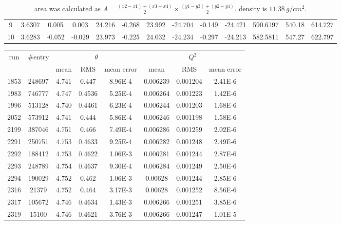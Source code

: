 \begin{landscape}
\begin{table}
\begin{tabular}{c | c | c c c c c c c c | c c c}
	9   & 3.6307	& 0.005	    & 0.003	& 24.216    & -0.268    & 23.992    & -24.704	& -0.149    & -24.421	& 590.6197  & 540.18	& 614.727	\\
	10  & 3.6283	& -0.052    & -0.029	& 23.973    & -0.225	& 24.032    & -24.234	& -0.297    & -24.213	& 582.5811  & 547.27	& 622.797	\\
	\hline
    \end{tabular}
    \caption{area was calculated as $A = \frac{(x2 - x1) + (x3 - x4)}{2} \times \frac{(y1 - y3) + (y2 - y4)}{2}$. 
    \Pb density is $11.38\ g/cm^2$.}
\end{table}
\end{landscape}

\begin{table}
    \centering
    \begin{tabular}{c c | c c c | c c c}
	\hline
	\multirow{2}{*}{run} & \multirow{2}{*}{\#entry}	& \multicolumn{3}{c|}{$\theta$}	& \multicolumn{3}{c}{$Q^2$} \\
	\cline{3-8}
	    &	& mean & RMS	& mean error	& mean	& RMS	& mean error	\\
	\hline
	1853	& 248697    & 4.741 & 0.447	& 8.96E-4    & 0.006239    & 0.001204    & 2.41E-6    \\
	1983	& 746777    & 4.747 & 0.4536	& 5.25E-4    & 0.006264    & 0.001223    & 1.42E-6    \\
	1996	& 513128    & 4.740 & 0.4461	& 6.23E-4    & 0.006244    & 0.001203    & 1.68E-6    \\
	2052	& 573912    & 4.741 & 0.444	& 5.86E-4    & 0.006246    & 0.001198    & 1.58E-6    \\
	2199	& 387046    & 4.751 & 0.466	& 7.49E-4    & 0.006286    & 0.001259    & 2.02E-6    \\
	2291	& 250751    & 4.753 & 0.4633	& 9.25E-4    & 0.006282    & 0.001248    & 2.49E-6    \\
	2292	& 188412    & 4.753 & 0.4622	& 1.06E-3    & 0.006281    & 0.001244    & 2.87E-6    \\
	2293	& 248789    & 4.754 & 0.4637	& 9.30E-4    & 0.006284    & 0.001249    & 2.50E-6    \\
	2294	& 190029    & 4.752 & 0.462	& 1.06E-3    & 0.00628	   & 0.001244    & 2.85E-6    \\
	2316	& 21379	    & 4.752 & 0.464	& 3.17E-3    & 0.00628	   & 0.001252    & 8.56E-6    \\
	2317	& 105672    & 4.746 & 0.4634	& 1.43E-3    & 0.006266    & 0.001251    & 3.85E-6    \\
	2319	& 15100	    & 4.746 & 0.4621	& 3.76E-3    & 0.006266    & 0.001247    & 1.01E-5    \\

\end{tabular}
\end{table}
